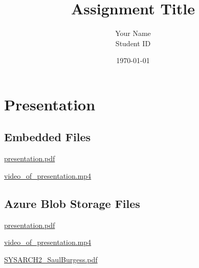 \documentclass[10pt]{article}
\title{Assignment Title}
\author{Your Name \\ Student ID}
\date{\today}
\begin{document}
\begin{titlepage}
\end{titlepage}

{\tableofcontents}
{\newpage}

\section{Presentation}

\subsection{Embedded Files}
\begin{center}
	\href{run:./presentation.pdf}{presentation.pdf}

	\vspace*{1cm}

	\href{run:./SYSARCH_AS2.mp4}{video\_of\_presentation.mp4}
\end{center}

\subsection{Azure Blob Storage Files}
\begin{center}
	\href{https://c19349793test.blob.core.windows.net/assignment-share/presentation.pdf}{presentation.pdf}

	\vspace*{1cm}

	\href{https://c19349793test.blob.core.windows.net/assignment-share/SYSARCH_AS2.mp4}{video\_of\_presentation.mp4}

	\vspace*{1cm}

	\href{https://c19349793test.blob.core.windows.net/assignment-share/SYSARCH2_SaulBurgess.pdf}{SYSARCH2\_SaulBurgess.pdf}

\end{center}
{\newpage}
\end{document}
